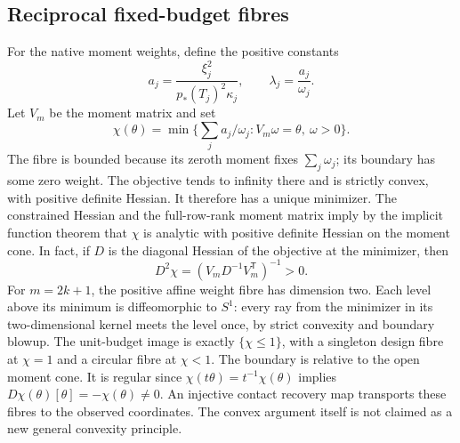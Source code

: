 \documentclass[11pt,reqno]{amsart}
\numberwithin{equation}{section}
\theoremstyle{definition}\newtheorem{definition}[theorem]{Definition}
\theoremstyle{remark}\newtheorem{remark}[theorem]{Remark}
\begin{document}
\subsection{Reciprocal fixed-budget fibres}
For the native moment weights, define the positive constants
\[
 a_j=\frac{\xi_j^2}{p_*(T_j)^2\kappa_j},\qquad \lambda_j=\frac{a_j}{\omega_j}.
\]
Let $V_m$ be the moment matrix and set
\[
 \chi(\theta)=\min\Big\{\sum_j a_j/\omega_j:V_m\omega=\theta,\ \omega>0\Big\}.
\]
The fibre is bounded because its zeroth moment fixes $\sum_j\omega_j$; its boundary has some zero weight. The objective tends to infinity there and is strictly convex, with positive definite Hessian. It therefore has a unique minimizer. The constrained Hessian and the full-row-rank moment matrix imply by the implicit function theorem that $\chi$ is analytic with positive definite Hessian on the moment cone. In fact, if $D$ is the diagonal Hessian of the objective at the minimizer, then
\[
 D^2\chi=(V_mD^{-1}V_m^{\mathsf T})^{-1}>0.
\]
For $m=2k+1$, the positive affine weight fibre has dimension two. Each level above its minimum is diffeomorphic to $S^1$: every ray from the minimizer in its two-dimensional kernel meets the level once, by strict convexity and boundary blowup. The unit-budget image is exactly $\{\chi\le1\}$, with a singleton design fibre at $\chi=1$ and a circular fibre at $\chi<1$. The boundary is relative to the open moment cone. It is regular since $\chi(t\theta)=t^{-1}\chi(\theta)$ implies $D\chi(\theta)[\theta]=-\chi(\theta)\ne0$. An injective contact recovery map transports these fibres to the observed coordinates. The convex argument itself is not claimed as a new general convexity principle.
\end{document}
